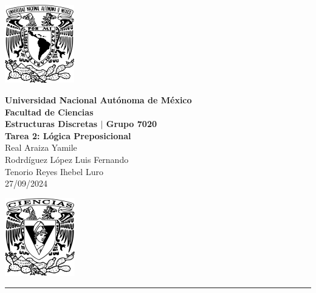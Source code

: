 \documentclass[11pt,letterpaper]{article}
\begin{document}

\begin{center}
    \begin{minipage}{3cm}
    	\begin{center}
    		\includegraphics[height=3.4cm]{./imagenes/logo_unam.png}
    	\end{center}
    \end{minipage}\hfill
    \begin{minipage}{10cm}
    	\begin{center}
    	\textbf{\large Universidad Nacional Autónoma de México}\\[0.1cm]
        \textbf{Facultad de Ciencias}\\[0.1cm]
        \textbf{Estructuras Discretas $|$ Grupo 7020}\\[0.1cm]
        \textbf{Tarea 2: Lógica Preposicional}\\[0.1cm]
        Real Araiza Yamile\\[0.1cm]
        Rodrdíguez López Luis Fernando\\[0.1cm]
        Tenorio Reyes Ihebel Luro\\[0.1cm]
        27/09/2024
    	\end{center}
    \end{minipage}\hfill
    \begin{minipage}{3cm}
    	\begin{center}
    		\includegraphics[height=3.4cm]{./imagenes/Logo_FC.png}
    	\end{center}
    \end{minipage}
\end{center}

\rule{17cm}{0.1mm}

\end{document}
